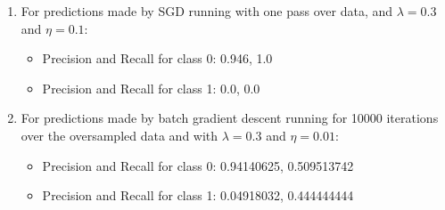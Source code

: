 \documentclass[letterpaper]{article}
\begin{document}
\begin{enumerate}
\item For predictions made by SGD running with one pass over data, and $\lambda = 0.3$ and $\eta = 0.1$:
\begin{itemize}
\item Precision and Recall for class 0: 0.946, 1.0
\item Precision and Recall for class 1: 0.0, 0.0
\end{itemize}

\item For predictions made by batch gradient descent running for 10000 iterations over the oversampled data and with $\lambda = 0.3$ and $\eta = 0.01$:
\begin{itemize}
\item Precision and Recall for class 0: 0.94140625, 0.509513742
\item Precision and Recall for class 1: 0.04918032, 0.444444444
\end{itemize}
\end{enumerate}
\end{document}
